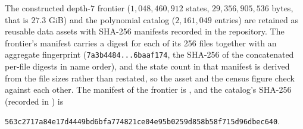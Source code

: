 \documentclass[11pt]{article}
\theoremstyle{definition}
\theoremstyle{remark}
\begin{document}
The constructed depth-$7$ frontier ($1{,}048{,}460{,}912$ states,
$29{,}356{,}905{,}536$ bytes, that is $27.3$ GiB) and the polynomial catalog
($2{,}161{,}049$ entries) are retained as reusable data assets with SHA-256
manifests recorded in the repository. The frontier's manifest carries a digest
for each of its 256 files together with an aggregate fingerprint
(\texttt{7a3b4484...6baaf174}, the SHA-256 of the concatenated per-file digests
in name order), and the state count in that manifest is derived from the file
sizes rather than restated, so the asset and the census figure check against
each other. The manifest of the frontier is
, and the
catalog's SHA-256 (recorded in
) is
\begin{center}\small\texttt{563c2717a84e17d4449bd6bfa774821ce04e95b0259d858b58f715d96dbec640}.\end{center}
\end{document}
